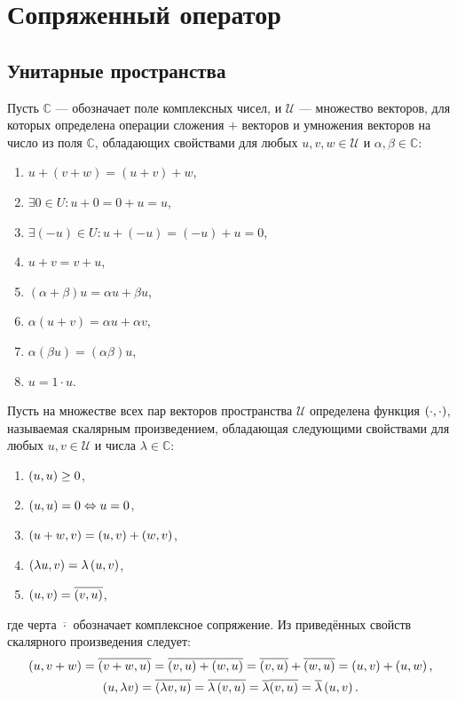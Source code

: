 \chapter{Сопряженный оператор}


\section{Унитарные пространства}

Пусть $\mathbb{C}$ --- обозначает поле комплексных чисел, и $\mathcal{U}$ --- множество векторов, для которых определена операции сложения $+$ векторов и умножения
векторов на число из поля $\mathbb{C}$, обладающих свойствами для любых $u, v, w \in \mathcal{U}$ и $\alpha, \beta \in \mathbb{C}$:
\begin{enumerate}
    \item $u + ( v + w ) = ( u + v ) + w$,
    \item $\exists 0 \in U: u + 0 = 0 + u = u$,
    \item $\exists (-u) \in U: u + (-u) = (-u) + u = 0$,
    \item $u + v = v + u$,
    \item $(\alpha + \beta) u = \alpha u + \beta u$,
    \item $\alpha ( u + v ) = \alpha u + \alpha v$,
    \item $\alpha (\beta u) = (\alpha \beta) u$,
    \item $u = 1 \cdot u$.
\end{enumerate}

Пусть на множестве всех пар векторов пространства $\mathcal{U}$ определена функция $\left ( \cdot, \cdot \right )$, называемая скалярным произведением, обладающая
следующими свойствами для любых $u, v \in \mathcal{U}$ и числа $\lambda \in \mathbb{C}$:
\begin{enumerate}
    \item $\left ( u, u \right ) \ge 0$,
    \item $\left ( u, u \right ) = 0 \Leftrightarrow u = 0$,
    \item $\left ( u + w, v \right ) = \left ( u, v \right ) + \left ( w, v \right )$,
    \item $\left ( \lambda u, v \right ) = \lambda \left ( u, v \right )$,
    \item $\left ( u, v \right ) = \overline{\left ( v, u \right )}$,
\end{enumerate}
где черта $\overline{\cdot}$ обозначает комплексное сопряжение. Из приведённых свойств скалярного произведения следует:
\begin{gather*}
    \left ( u, v + w \right )
    = \overline{\left ( v + w, u \right )}
    = \overline{\left ( v, u \right ) + \left ( w, u \right )}
    = \overline{\left ( v, u \right )} + \overline{\left ( w, u \right )}
    = \left ( u, v \right ) + \left ( u, w \right ), \\
    \left ( u, \lambda v \right )
    = \overline{\left ( \lambda v, u \right )}
    = \overline{\lambda  \left ( v, u \right )}
    = \overline{\lambda} \overline{\left ( v, u \right )}
    = \overline{\lambda} \left ( u, v \right ) .
\end{gather*}

